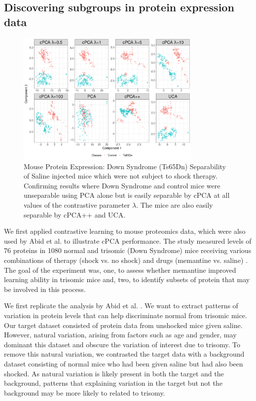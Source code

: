 \documentclass[12pt]{article}
\begin{document}
\subsection{\label{sec:mouse}Discovering subgroups in protein expression data}
\begin{figure}[th!]
  \centering
  \includegraphics[width = 0.8\textwidth]{figure/Mouse_Data.png}
  \caption{Mouse Protein Expression: Down Syndrome (Ts65Dn) Separability of Saline injected mice which were not subject to shock therapy. Confirming \cite{Abid} results where Down Syndrome and control mice were unseparable using PCA alone but is easily separable by cPCA at all values of the contrastive parameter $\lambda$. The mice are also easily separable by cPCA++ and UCA.}
  \label{fig:Mouse}
\end{figure}


We first applied contrastive learning to mouse proteomics data, which were also used by Abid et al. \cite{Abid} to illustrate cPCA performance. The study measured levels of 76 proteins in 1080 normal and trisomic (Down Syndrome) mice receiving various combinations of therapy (shock vs. no shock) and drugs (memantine vs. saline) \cite{Ahmed, Higuera, Abid}. The goal of the experiment was, one, to assess whether memantine improved learning ability in trisomic mice and, two, to identify subsets of protein that may be involved in this process.

We first replicate the analysis by Abid et al. \cite{Abid}. We want to extract patterns of variation in protein levels that can help discriminate normal from trisomic mice. Our target dataset consisted of protein data from unshocked mice given saline. However, natural variation, arising from factors such as age and gender, may dominant this dataset and obscure the variation of interest due to trisomy. To remove this natural variation, we contrasted the target data with a background dataset consisting of normal mice who had been given saline but had also been shocked. As natural variation is likely present in both the target and the background, patterns that explaining variation in the target but not the background may be more likely to related to trisomy.
\end{document}
